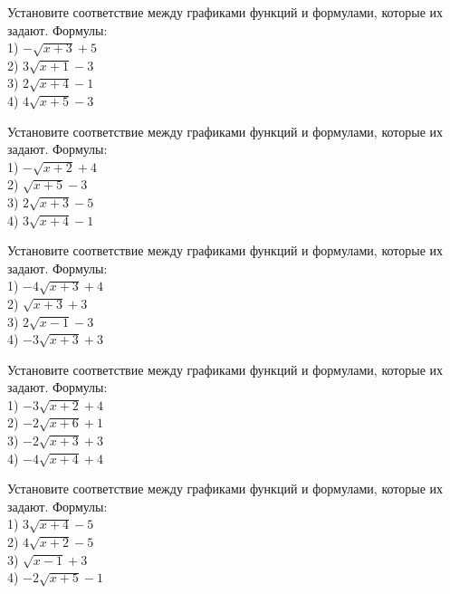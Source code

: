 \documentclass[4apaper]{article}
\begin{document}
\begin{taskBN}{66}
Установите соответствие между графиками функций и формулами, которые их задают. Формулы: \\1) $-\sqrt{x+3}+5$\\2) $3\sqrt{x+1}-3$\\3) $2\sqrt{x+4}-1$\\4) $4\sqrt{x+5}-3$
\end{taskBN}

\begin{taskBN}{67}
Установите соответствие между графиками функций и формулами, которые их задают. Формулы: \\1) $-\sqrt{x+2}+4$\\2) $\sqrt{x+5}-3$\\3) $2\sqrt{x+3}-5$\\4) $3\sqrt{x+4}-1$
\end{taskBN}

\begin{taskBN}{68}
Установите соответствие между графиками функций и формулами, которые их задают. Формулы: \\1) $-4\sqrt{x+3}+4$\\2) $\sqrt{x+3}+3$\\3) $2\sqrt{x-1}-3$\\4) $-3\sqrt{x+3}+3$
\end{taskBN}

\begin{taskBN}{69}
Установите соответствие между графиками функций и формулами, которые их задают. Формулы: \\1) $-3\sqrt{x+2}+4$\\2) $-2\sqrt{x+6}+1$\\3) $-2\sqrt{x+3}+3$\\4) $-4\sqrt{x+4}+4$
\end{taskBN}

\begin{taskBN}{70}
Установите соответствие между графиками функций и формулами, которые их задают. Формулы: \\1) $3\sqrt{x+4}-5$\\2) $4\sqrt{x+2}-5$\\3) $\sqrt{x-1}+3$\\4) $-2\sqrt{x+5}-1$
\end{taskBN}
\end{document}
